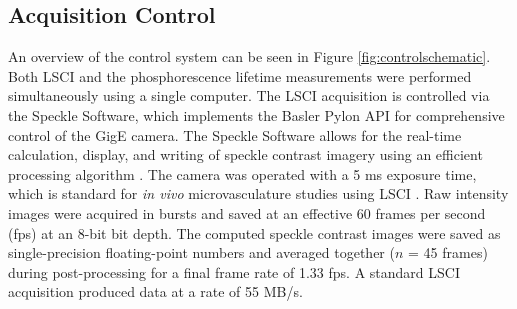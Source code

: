 \begin{table}
    \caption{Summary of optical filters in the imaging system}
    \label{tab:filters}
    \centering
\end{table}

\subsection{Acquisition Control} \label{ssec:acquisition_control}

An overview of the control system can be seen in Figure \ref{fig:controlschematic}. Both LSCI and the phosphorescence lifetime measurements were performed simultaneously using a single computer. The LSCI acquisition is controlled via the Speckle Software, which implements the Basler Pylon API for comprehensive control of the GigE camera. The Speckle Software allows for the real-time calculation, display, and writing of speckle contrast imagery using an efficient processing algorithm \cite{Tom:2008tg}. The camera was operated with a 5 ms exposure time, which is standard for \textit{in vivo} microvasculature studies using LSCI \cite{Yuan:2005tj}. Raw intensity images were acquired in bursts and saved at an effective 60 frames per second (fps) at an 8-bit bit depth. The computed speckle contrast images were saved as single-precision floating-point numbers and averaged together ($n$ = 45 frames) during post-processing for a final frame rate of 1.33 fps. A standard LSCI acquisition produced data at a rate of 55 MB/s.


